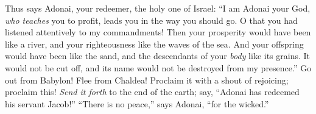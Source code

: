 \begin{biblechapter}
\verse Thus says Adonai, your redeemer, the holy one of Israel: “I am Adonai your God, \textit{who teaches} you to profit, 
leads you in the way you should go.
\verse O that you had listened attentively to my commandments!
\verse Then your prosperity would have been like a river, 
and your righteousness like the waves of the sea.
\verse And your offspring would have been like the sand, 
and the descendants of your \textit{body} like its grains. 
It would not be cut off, 
and its name would not be destroyed from my presence.”
\verse Go out from Babylon! 
Flee from Chaldea! 
Proclaim it with a shout of rejoicing; proclaim this! 
\textit{Send it forth} to the end of the earth; 
say, “Adonai has redeemed his servant Jacob!”
\verse “There is no peace,” says Adonai, “for the wicked.”
\end{biblechapter}

